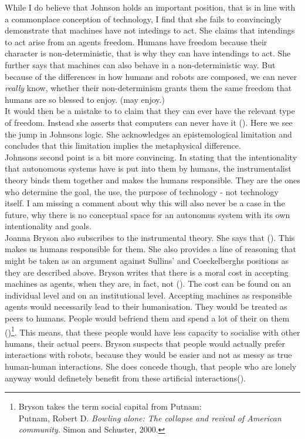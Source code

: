 \documentclass{article}
\begin{document}
While I do believe that Johnson holds an important position, that is in line
with a commonplace conception of technology, I find that she fails to
convincingly demonstrate that machines have not intedings to act. She claims that
intendings to act arise from an agents freedom. Humans have freedom because
their character is non-deterministic, that is why they can have intendings to
act. She further says that machines can also behave in a non-deterministic way.
But because of the differences in how humans and robots are composed, we can
never \textit{really} know, whether their non-determinism grants them the same
freedom that humans are so blessed to enjoy. (may enjoy.)\\ It would then be a
mistake to to claim that they can ever have the relevant type of freedom.
Instead she asserts that computers can never have it (\cite[p.
203]{johnson2006computer}). Here we see the jump in Johnsons logic. She
acknowledges an epistemological limitation and concludes that this limitation
implies the metaphysical difference.\\

Johnsons second point is a bit more convincing. In stating that the
intentionality that autonomous systems have is put into them by humans, the
instrumentalist theory binds them together and makes the humans responsible.
They are the ones who determine the goal, the use, the purpose of technology -
not technology itself. I am missing a comment about why this will also never be
a case in the future, why there is no conceptual space for an autonomus system
with its own intentionality and goals.\\

Joanna Bryson also subscribes to the instrumental theory. She says that
(\cite[p. 3]{bryson2010robots}). This makes us humans
responsible for them. She also provides a line of reasoning that
might be taken as an argument against Sullins' and Coeckelberghs positions as
they are described above. Bryson writes that there is a moral cost in accepting
machines as agents, when they are, in fact, not (\cite[p. 2]{bryson2010robots}).
The cost can be found on an individual level and on an institutional level.
Accepting machines as responsible agents would necessarily lead to their
humanisation. They would be treated as peers to humans. People would befriend them and
spend a lot of their  on them (\cite[p.
5]{bryson2010robots})\footnote{Bryson takes the term social capital from
	Putnam:\\
Putnam, Robert D. \textit{Bowling alone: The collapse and revival of American
community.} Simon and Schuster, 2000.}. 
This means, that these people would have less capacity to socialise with other
humans, their actual peers. Bryson suspects that people would actually prefer
interactions with robots, because they would be easier and not as messy as true
human-human interactions. She does concede though, that people who are lonely
anyway would definetely benefit from these artificial interactions(\cite[p.
5]{bryson2010robots}). 
\end{document}
